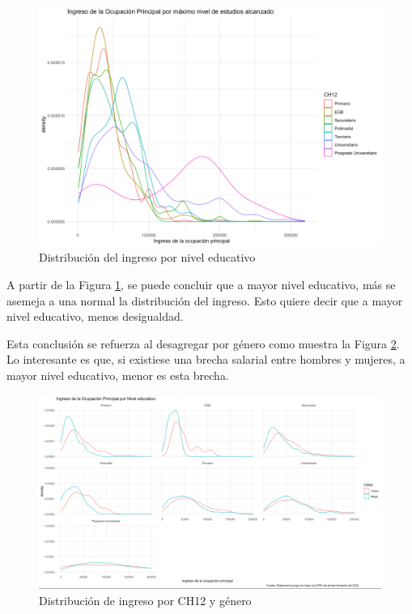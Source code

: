 \documentclass[a4paper]{article}
\theoremstyle{plain}
\theoremstyle{definition}
\begin{document}
\begin{figure}[h]
    \centering
    \includegraphics[scale=0.28]{figuras/distribucion_densidad_ingreso_ch12.png}
    \caption{Distribución del ingreso por nivel educativo}
    \label{fig:distribucion_del_ingreso_por_ch12}
\end{figure}

A partir de la Figura \ref{fig:distribucion_del_ingreso_por_ch12}, se puede concluir que a mayor nivel educativo, más se asemeja a una normal la distribución del ingreso. Esto quiere decir que a mayor nivel educativo, menos desigualdad. 

Esta conclusión se refuerza al desagregar por género como muestra la Figura     \ref{fig:kernel_ingreso_genero_nivel_ed}. 
Lo interesante es que, si existiese una brecha salarial entre hombres y mujeres, a mayor nivel educativo, menor es esta brecha. 
\begin{figure}[h]
    \centering
    \includegraphics[scale=0.28]{figuras/kernel_por_ch12_genero.png}
    \caption{Distribución de ingreso por CH12 y género}
    \label{fig:kernel_ingreso_genero_nivel_ed}
\end{figure}
\end{document}
